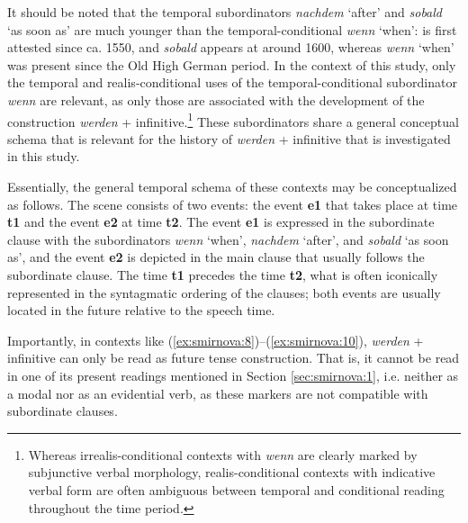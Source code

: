 \documentclass[output=paper,colorlinks,citecolor=brown]{langscibook}
\begin{document}
It should be noted that the temporal subordinators \emph{nachdem} `after' and \emph{sobald} `as soon as' are much younger than the temporal-conditional \emph{wenn} `when':  is first attested since ca. 1550, and \emph{sobald} appears at around 1600, whereas \emph{wenn} `when' was present since the Old High German period. In the context of this study, only the temporal and realis-conditional uses of the temporal-conditional subordinator \emph{wenn} are relevant, as only those are associated with the development of the construction \emph{werden} + infinitive.\footnote{Whereas irrealis-conditional contexts with \emph{wenn} are clearly marked by subjunctive verbal morphology, realis-conditional contexts with indicative verbal form are often ambiguous between temporal and conditional reading throughout the time period.} These subordinators share a general conceptual schema that is relevant for the history of \emph{werden} + infinitive that is investigated in this study. 
\par Essentially, the general temporal schema of these contexts may be conceptualized as follows. The scene consists of two events: the event \textbf{e1} that takes place at time \textbf{t1} and the event \textbf{e2} at time \textbf{t2}. The event \textbf{e1} is expressed in the subordinate clause with the subordinators \emph{wenn} `when', \emph{nachdem} `after', and \emph{sobald} `as soon as', and the event \textbf{e2} is depicted in the main clause that usually follows the subordinate clause. The time \textbf{t1} precedes the time \textbf{t2}, what is often iconically represented in the syntagmatic ordering of the clauses; both events are usually located in the future relative to the speech time. 
\par Importantly, in contexts like (\ref{ex:smirnova:8})--(\ref{ex:smirnova:10}), \emph{werden} + infinitive can only be read as future tense construction. That is, it cannot be read in one of its present readings mentioned in Section \ref{sec:smirnova:1}, i.e. neither as a modal nor as an evidential verb, as these markers are not compatible with subordinate clauses. 

\largerpage[-1]
\end{document}
